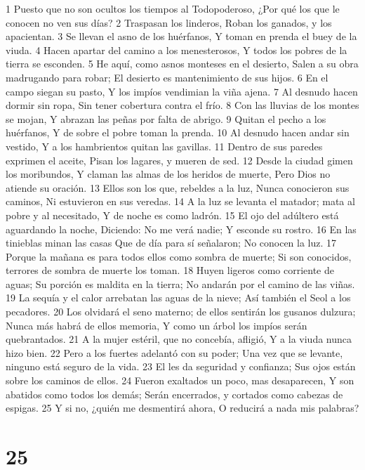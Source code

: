 1 Puesto que no son ocultos los tiempos al Todopoderoso,  
¿Por qué los que le conocen no ven sus días?  
2 Traspasan los linderos,  
Roban los ganados, y los apacientan.  
3 Se llevan el asno de los huérfanos,  
Y toman en prenda el buey de la viuda.  
4 Hacen apartar del camino a los menesterosos,  
Y todos los pobres de la tierra se esconden.  
5 He aquí, como asnos monteses en el desierto,  
Salen a su obra madrugando para robar;  
El desierto es mantenimiento de sus hijos.  
6 En el campo siegan su pasto,  
Y los impíos vendimian la viña ajena.  
7 Al desnudo hacen dormir sin ropa,  
Sin tener cobertura contra el frío.  
8 Con las lluvias de los montes se mojan,  
Y abrazan las peñas por falta de abrigo.  
9 Quitan el pecho a los huérfanos,  
Y de sobre el pobre toman la prenda.  
10 Al desnudo hacen andar sin vestido,  
Y a los hambrientos quitan las gavillas.  
11 Dentro de sus paredes exprimen el aceite,  
Pisan los lagares, y mueren de sed.  
12 Desde la ciudad gimen los moribundos,  
Y claman las almas de los heridos de muerte,  
Pero Dios no atiende su oración.  
13 Ellos son los que, rebeldes a la luz,  
Nunca conocieron sus caminos,  
Ni estuvieron en sus veredas.  
14 A la luz se levanta el matador; mata al pobre y al necesitado, 
Y de noche es como ladrón.  
15 El ojo del adúltero está aguardando la noche,  
Diciendo: No me verá nadie;  
Y esconde su rostro.  
16 En las tinieblas minan las casas  
Que de día para sí señalaron;  
No conocen la luz.  
17 Porque la mañana es para todos ellos como sombra de muerte;  
Si son conocidos, terrores de sombra de muerte los toman.  
18 Huyen ligeros como corriente de aguas;  
Su porción es maldita en la tierra;  
No andarán por el camino de las viñas.  
19 La sequía y el calor arrebatan las aguas de la nieve; 
Así también el Seol a los pecadores.  
20 Los olvidará el seno materno; de ellos sentirán los gusanos dulzura;  
Nunca más habrá de ellos memoria,  
Y como un árbol los impíos serán quebrantados.  
21 A la mujer estéril, que no concebía, afligió,  
Y a la viuda nunca hizo bien.  
22 Pero a los fuertes adelantó con su poder;  
Una vez que se levante, ninguno está seguro de la vida.  
23 El les da seguridad y confianza;  
Sus ojos están sobre los caminos de ellos.  
24 Fueron exaltados un poco, mas desaparecen,  
Y son abatidos como todos los demás;  
Serán encerrados, y cortados como cabezas de espigas.  
25 Y si no, ¿quién me desmentirá ahora,  
O reducirá a nada mis palabras?  

\chapter{25}

